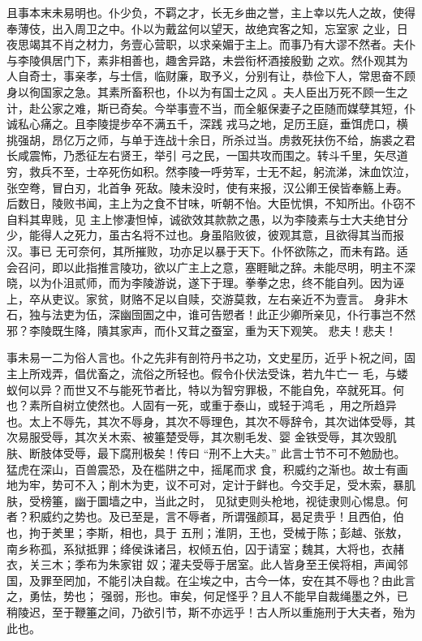 且事本末未易明也。仆少负，不羁之才，长无乡曲之誉，主上幸以先人之故，使得奉薄伎，出入周卫之中。仆以为戴盆何以望天，故绝宾客之知，忘室家
之业，日夜思竭其不肖之材力，务壹心营职，以求亲媚于主上。而事乃有大谬不然者。夫仆与李陵俱居门下，素非相善也，趣舍异路，未尝衔杯酒接殷勤
之欢。然仆观其为人自奇士，事亲孝，与士信，临财廉，取予义，分别有让，恭俭下人，常思奋不顾身以徇国家之急。其素所畜积也，仆以为有国士之风
。夫人臣出万死不顾一生之计，赴公家之难，斯已奇矣。今举事壹不当，而全躯保妻子之臣随而媒孽其短，仆诚私心痛之。且李陵提步卒不满五千，深践
戎马之地，足历王庭，垂饵虎口，横挑强胡，昂亿万之师，与单于连战十余日，所杀过当。虏救死扶伤不给，旃裘之君长咸震怖，乃悉征左右贤王，举引
弓之民，一国共攻而围之。转斗千里，矢尽道穷，救兵不至，士卒死伤如积。然李陵一呼劳军，士无不起，躬流涕，沫血饮泣，张空弮，冒白刃，北首争
死敌。陵未没时，使有来报，汉公卿王侯皆奉觞上寿。后数日，陵败书闻，主上为之食不甘味，听朝不怡。大臣忧惧，不知所出。仆窃不自料其卑贱，见
主上惨凄怛悼，诚欲效其款款之愚，以为李陵素与士大夫绝甘分少，能得人之死力，虽古名将不过也。身虽陷败彼，彼观其意，且欲得其当而报汉。事已
无可奈何，其所摧败，功亦足以暴于天下。仆怀欲陈之，而未有路。适会召问，即以此指推言陵功，欲以广主上之意，塞睚眦之辞。未能尽明，明主不深
晓，以为仆沮贰师，而为李陵游说，遂下于理。拳拳之忠，终不能自列。因为诬上，卒从吏议。家贫，财赂不足以自赎，交游莫救，左右亲近不为壹言。
身非木石，独与法吏为伍，深幽囹圄之中，谁可告愬者！此正少卿所亲见，仆行事岂不然邪？李陵既生降，隤其家声，而仆又茸之蚕室，重为天下观笑。
悲夫！悲夫！


事未易一二为俗人言也。仆之先非有剖符丹书之功，文史星历，近乎卜祝之间，固主上所戏弄，倡优畜之，流俗之所轻也。假令仆伏法受诛，若九牛亡一
毛，与蝼蚁何以异？而世又不与能死节者比，特以为智穷罪极，不能自免，卒就死耳。何也？素所自树立使然也。人固有一死，或重于泰山，或轻于鸿毛
，用之所趋异也。太上不辱先，其次不辱身，其次不辱理色，其次不辱辞令，其次诎体受辱，其次易服受辱，其次关木索、被箠楚受辱，其次剔毛发、婴
金铁受辱，其次毁肌肤、断肢体受辱，最下腐刑极矣！传曰 “刑不上大夫。” 此言士节不可不勉励也。猛虎在深山，百兽震恐，及在槛阱之中，摇尾而求
食，积威约之渐也。故士有画地为牢，势可不入；削木为吏，议不可对，定计于鲜也。今交手足，受木索，暴肌肤，受榜箠，幽于圜墙之中，当此之时，
见狱吏则头枪地，视徒隶则心惕息。何者？积威约之势也。及已至是，言不辱者，所谓强颜耳，曷足贵乎！且西伯，伯也，拘于羑里；李斯，相也，具于
五刑；淮阴，王也，受械于陈；彭越、张敖，南乡称孤，系狱抵罪；绛侯诛诸吕，权倾五伯，囚于请室；魏其，大将也，衣赭衣，关三木；季布为朱家钳
奴；灌夫受辱于居室。此人皆身至王侯将相，声闻邻国，及罪至罔加，不能引决自裁。在尘埃之中，古今一体，安在其不辱也？由此言之，勇怯，势也；
强弱，形也。审矣，何足怪乎？且人不能早自裁绳墨之外，已稍陵迟，至于鞭箠之间，乃欲引节，斯不亦远乎！古人所以重施刑于大夫者，殆为此也。


